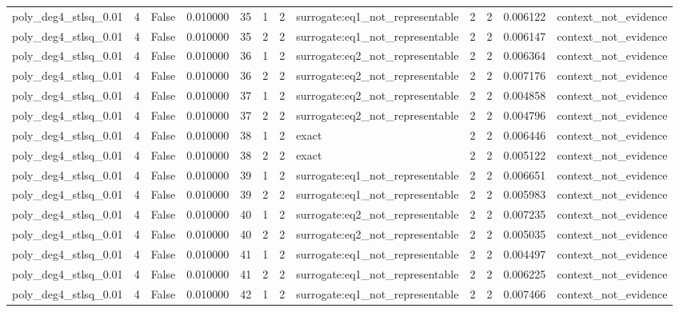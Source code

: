 \begin{tabular}{lrrrrrrlrrrl}
poly\_deg4\_stlsq\_0.01 & 4 & False & 0.010000 & 35 & 1 & 2 & surrogate:eq1\_not\_representable & 2 & 2 & 0.006122 & context\_not\_evidence \\
poly\_deg4\_stlsq\_0.01 & 4 & False & 0.010000 & 35 & 2 & 2 & surrogate:eq1\_not\_representable & 2 & 2 & 0.006147 & context\_not\_evidence \\
poly\_deg4\_stlsq\_0.01 & 4 & False & 0.010000 & 36 & 1 & 2 & surrogate:eq2\_not\_representable & 2 & 2 & 0.006364 & context\_not\_evidence \\
poly\_deg4\_stlsq\_0.01 & 4 & False & 0.010000 & 36 & 2 & 2 & surrogate:eq2\_not\_representable & 2 & 2 & 0.007176 & context\_not\_evidence \\
poly\_deg4\_stlsq\_0.01 & 4 & False & 0.010000 & 37 & 1 & 2 & surrogate:eq2\_not\_representable & 2 & 2 & 0.004858 & context\_not\_evidence \\
poly\_deg4\_stlsq\_0.01 & 4 & False & 0.010000 & 37 & 2 & 2 & surrogate:eq2\_not\_representable & 2 & 2 & 0.004796 & context\_not\_evidence \\
poly\_deg4\_stlsq\_0.01 & 4 & False & 0.010000 & 38 & 1 & 2 & exact & 2 & 2 & 0.006446 & context\_not\_evidence \\
poly\_deg4\_stlsq\_0.01 & 4 & False & 0.010000 & 38 & 2 & 2 & exact & 2 & 2 & 0.005122 & context\_not\_evidence \\
poly\_deg4\_stlsq\_0.01 & 4 & False & 0.010000 & 39 & 1 & 2 & surrogate:eq1\_not\_representable & 2 & 2 & 0.006651 & context\_not\_evidence \\
poly\_deg4\_stlsq\_0.01 & 4 & False & 0.010000 & 39 & 2 & 2 & surrogate:eq1\_not\_representable & 2 & 2 & 0.005983 & context\_not\_evidence \\
poly\_deg4\_stlsq\_0.01 & 4 & False & 0.010000 & 40 & 1 & 2 & surrogate:eq2\_not\_representable & 2 & 2 & 0.007235 & context\_not\_evidence \\
poly\_deg4\_stlsq\_0.01 & 4 & False & 0.010000 & 40 & 2 & 2 & surrogate:eq2\_not\_representable & 2 & 2 & 0.005035 & context\_not\_evidence \\
poly\_deg4\_stlsq\_0.01 & 4 & False & 0.010000 & 41 & 1 & 2 & surrogate:eq1\_not\_representable & 2 & 2 & 0.004497 & context\_not\_evidence \\
poly\_deg4\_stlsq\_0.01 & 4 & False & 0.010000 & 41 & 2 & 2 & surrogate:eq1\_not\_representable & 2 & 2 & 0.006225 & context\_not\_evidence \\
poly\_deg4\_stlsq\_0.01 & 4 & False & 0.010000 & 42 & 1 & 2 & surrogate:eq1\_not\_representable & 2 & 2 & 0.007466 & context\_not\_evidence \\

\end{tabular}
